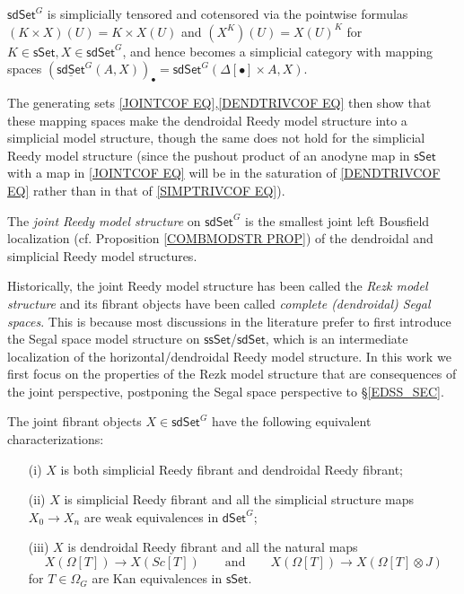 \documentclass[a4paper,10pt
 ,draft
]{article}%
\begin{document}
\begin{remark}\label{MAPSPACE REM}
$\mathsf{sdSet}^G$ is simplicially tensored and cotensored via the pointwise 
formulas $(K \times X)(U) = K \times X(U)$ and
$\left(X^K\right)(U) = X(U)^K$
for $K \in \mathsf{sSet}, X \in \mathsf{sdSet}^G$, 
and hence becomes a simplicial category with mapping spaces
$\left(\underline{\mathsf{sdSet}}^G(A,X)\right)_{\bullet} = \mathsf{sdSet}^G(\Delta[\bullet] \times A,X)$.

The generating sets \eqref{JOINTCOF EQ},\eqref{DENDTRIVCOF EQ} then show that these mapping spaces make the dendroidal Reedy model structure into a simplicial model structure, though the same does not hold for the simplicial Reedy model structure
(since the pushout product of an anodyne map in $\mathsf{sSet}$ with a map in \eqref{JOINTCOF EQ} will be in the saturation of \eqref{DENDTRIVCOF EQ} rather than in that of \eqref{SIMPTRIVCOF EQ}).
\end{remark}


\begin{definition}\label{JOINREED DEF}
The \textit{joint Reedy model structure} on $\mathsf{sdSet}^G$ is the smallest joint left Bousfield localization (cf. Proposition \ref{COMBMODSTR PROP}) of the dendroidal and simplicial Reedy model structures.
\end{definition}


\begin{remark}\label{JOINREED REM}
Historically, the joint Reedy model structure has been called the \textit{Rezk model structure} and its fibrant objects have been called 
\textit{complete (dendroidal) Segal spaces}.
This is because most discussions in the literature 
\cite{Rez01,CM13a}
prefer to first introduce the Segal space model structure on
$\mathsf{ssSet}$/$\mathsf{sdSet}$, which is an intermediate localization of the 
horizontal/dendroidal Reedy model structure.
In this work we first focus on the properties of the Rezk model structure that are consequences of the joint perspective, 
postponing the Segal space perspective to \S \ref{EDSS_SEC}.
\end{remark}


\begin{proposition}\label{JOINTFIBCHAR PROP}
The joint fibrant objects $X \in \mathsf{sdSet}^G$ have the following equivalent characterizations:
\begin{itemize}
	\item[(i)] $X$ is both simplicial Reedy fibrant and dendroidal Reedy fibrant;
	\item[(ii)] $X$ is simplicial Reedy fibrant and all the simplicial structure maps 
	$X_0 \to X_n$ are weak equivalences in $\mathsf{dSet}^{G}$;
	\item[(iii)] $X$ is dendroidal Reedy fibrant and all the natural maps
\begin{equation}\label{JOINTFIBCHAR EQ}
	X\left(\Omega[T]\right) \to X\left(Sc[T]\right)
\qquad \text{and} \qquad
	X\left(\Omega[T]\right) \to X(\Omega[T]\otimes J)
\end{equation}
for $T \in \Omega_G$ are Kan equivalences in $\mathsf{sSet}$.
\end{itemize}
\end{proposition}
\end{document}
